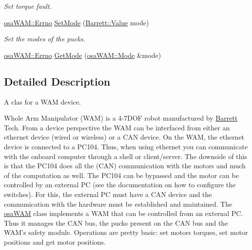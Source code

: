 \begin{DoxyCompactItemize}
\begin{DoxyCompactList}\small\item\em Set torque fault. \end{DoxyCompactList}\item 
\hyperlink{classosa_w_a_m_aff15893cc52d67e46cb66de794109f9e}{osa\-W\-A\-M\-::\-Errno} \hyperlink{classosa_w_a_m_a88bd8bca8f85f58fb629fb6cdb7671e8}{Set\-Mode} (\hyperlink{struct_barrett_a57ff132885344ca62e4b4b691885685b}{Barrett\-::\-Value} mode)
\begin{DoxyCompactList}\small\item\em Set the modes of the pucks. \end{DoxyCompactList}\item 
\hyperlink{classosa_w_a_m_aff15893cc52d67e46cb66de794109f9e}{osa\-W\-A\-M\-::\-Errno} \hyperlink{classosa_w_a_m_a1e717c2a9cb551b6c1a232a5d3b3fbf9}{Get\-Mode} (\hyperlink{classosa_w_a_m_a3671dc191688751cf712bbbd5f36a0d0}{osa\-W\-A\-M\-::\-Mode} \&mode)
\end{DoxyCompactItemize}


\subsection{Detailed Description}
A clas for a W\-A\-M device. 

Whole Arm Manipulator (W\-A\-M) is a 4-\/7\-D\-O\-F robot manufactured by \hyperlink{struct_barrett}{Barrett} Tech. From a device perspective the W\-A\-M can be interfaced from either an ethernet device (wired or wireless) or a C\-A\-N device. On the W\-A\-M, the ethernet device is connected to a P\-C104. Thus, when using ethernet you can communicate with the onboard computer through a shell or client/server. The downside of this is that the P\-C104 does all the (C\-A\-N) communication with the motors and much of the computation as well. The P\-C104 can be bypassed and the motor can be controlled by an external P\-C (see the documentation on how to configure the switches). For this, the external P\-C must have a C\-A\-N device and the communication with the hardware must be established and maintained. The \hyperlink{classosa_w_a_m}{osa\-W\-A\-M} class implements a W\-A\-M that can be controlled from an external P\-C. Thus it manages the C\-A\-N bus, the pucks present on the C\-A\-N bus and the W\-A\-M's safety module. Operations are pretty basic\-: set motors torques, set motor positions and get motor positions. 

